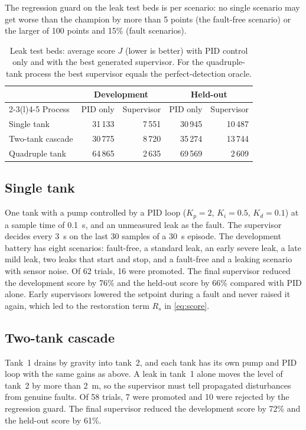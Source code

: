 The regression guard on the leak test beds is per scenario: no single
scenario may get worse than the champion by more than 5 points (the
fault-free scenario) or the larger of 100 points and 15\% (fault scenarios).

\begin{table}[tb]
  \centering
  \caption{Leak test beds: average score $J$ (lower is better) with PID
    control only and with the best generated supervisor. For the
    quadruple-tank process the best supervisor equals the perfect-detection
    oracle.}
  \label{tab:summary}
  \begin{tabular}{@{}lrrrr@{}}
    \toprule
    & \multicolumn{2}{c}{Development} & \multicolumn{2}{c}{Held-out} \\
    \cmidrule(lr){2-3}\cmidrule(l){4-5}
    Process & PID only & Supervisor & PID only & Supervisor \\
    \midrule
    Single tank      & 31\,133 & 7\,551 & 30\,945 & 10\,487 \\
    Two-tank cascade & 30\,775 & 8\,720 & 35\,274 & 13\,744 \\
    Quadruple tank   & 64\,865 & 2\,635 & 69\,569 &  2\,609 \\
    \bottomrule
  \end{tabular}
\end{table}

\subsection{Single tank}
One tank with a pump controlled by a PID loop
($K_p = 2$, $K_i = 0.5$, $K_d = 0.1$) at a sample time of 0.1~s, and an
unmeasured leak as the fault. The supervisor decides every 3~s on the last
30 samples of a 30~s episode. The development battery has eight scenarios:
fault-free, a standard leak, an early severe leak, a late mild leak, two
leaks that start and stop, and a fault-free and a leaking scenario with
sensor noise. Of 62 trials, 16 were promoted. The final supervisor
reduced the development score by 76\% and the held-out score by 66\%
compared with PID alone. Early supervisors lowered the setpoint during a fault
and never raised it again, which led to the restoration term $R_s$ in
\eqref{eq:score}.

\subsection{Two-tank cascade}
Tank~1 drains by gravity into tank~2, and each tank has
its own pump and PID loop with the same gains as above. A leak in tank~1
alone moves the level of tank~2 by more than 2~m, so the supervisor must tell
propagated disturbances from genuine faults. Of 58 trials, 7 were promoted and
10 were rejected by the regression guard. The final supervisor reduced the
development score by 72\% and the held-out score by 61\%.

